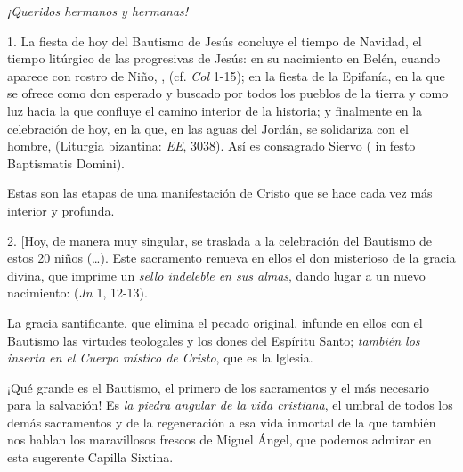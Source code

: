 				
				\begin{body}
					\emph{¡Queridos hermanos y hermanas!}
					
					1. La fiesta de hoy del Bautismo de Jesús concluye el tiempo de Navidad, el tiempo litúrgico de las progresivas  de Jesús: en su nacimiento en Belén, cuando aparece con rostro de Niño, ,  (cf. \emph{Col} 1-15); en la fiesta de la Epifanía, en la que se ofrece como don esperado y buscado por todos los pueblos de la tierra y como luz hacia la que confluye el camino interior de la historia; y finalmente en la celebración de hoy, en la que, en las aguas del Jordán, se solidariza con el hombre,  (Liturgia bizantina: \emph{EE}, 3038). Así es consagrado Siervo  ( in festo Baptismatis Domini).
					
					Estas son las etapas de una manifestación de Cristo que se hace cada vez más interior y profunda.
					
					2. {[}Hoy, de manera muy singular, se traslada a la celebración del Bautismo de estos 20 niños (\ldots{}). Este sacramento renueva en ellos el don misterioso de la gracia divina, que imprime un \emph{sello indeleble en sus almas}, dando lugar a un nuevo nacimiento:  (\emph{Jn} 1, 12-13).
					
					La gracia santificante, que elimina el pecado original, infunde en ellos con el Bautismo las virtudes teologales y los dones del Espíritu Santo; \emph{también los inserta en el Cuerpo místico de Cristo}, que es la Iglesia.
					
					¡Qué grande es el Bautismo, el primero de los sacramentos y el más necesario para la salvación! Es \emph{la piedra angular de la vida cristiana}, el umbral de todos los demás sacramentos y de la regeneración a esa vida inmortal de la que también nos hablan los maravillosos frescos de Miguel Ángel, que podemos admirar en esta sugerente Capilla Sixtina.
					

\end{body}
